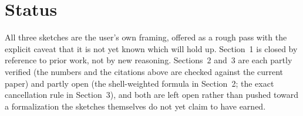 \documentclass[11pt]{article}
\begin{document}
\section{Status}

All three sketches are the user's own framing, offered as a rough
pass with the explicit caveat that it is not yet known which will
hold up. Section~1 is closed by reference to prior work, not by new
reasoning. Sections~2 and~3 are each partly verified (the numbers
and the citations above are checked against the current paper) and
partly open (the shell-weighted formula in Section~2; the exact
cancellation rule in Section~3), and both are left open rather than
pushed toward a formalization the sketches themselves do not yet
claim to have earned.
\end{document}
